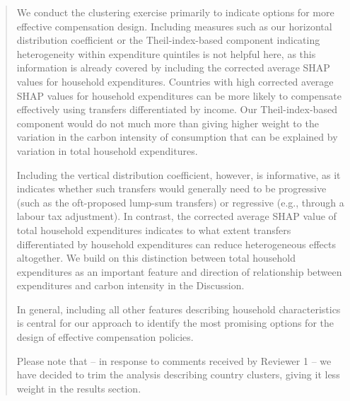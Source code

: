 \documentclass[11pt]{article}
\newenvironment{response}
{\begin{quote}\color{black}}
{\end{quote}}
\begin{document}
\begin{response}
    We conduct the clustering exercise primarily to indicate options for more effective compensation design. Including measures such as our horizontal distribution coefficient or the Theil-index-based component indicating heterogeneity within expenditure quintiles is not helpful here, as this information is already covered by including the corrected average SHAP values for household expenditures. Countries with high corrected average SHAP values for household expenditures can be more likely to compensate effectively using transfers differentiated by income. Our Theil-index-based component would do not much more than giving higher weight to the variation in the carbon intensity of consumption that can be explained by variation in total household expenditures.

    Including the vertical distribution coefficient, however, is informative, as it indicates whether such transfers would generally need to be progressive (such as the oft-proposed lump-sum transfers) or regressive (e.g., through a labour tax adjustment). In contrast, the corrected average SHAP value of total household expenditures indicates to what extent transfers differentiated by household expenditures can reduce heterogeneous effects altogether. We build on this distinction between total household expenditures as an important feature and direction of relationship between expenditures and carbon intensity in the Discussion.

    In general, including all other features describing household characteristics is central for our approach to identify the most promising options for the design of effective compensation policies.


    Please note that -- in response to comments received by Reviewer 1 -- we have decided to trim the analysis describing country clusters, giving it less weight in the results section. 
\end{response}
\end{document}
